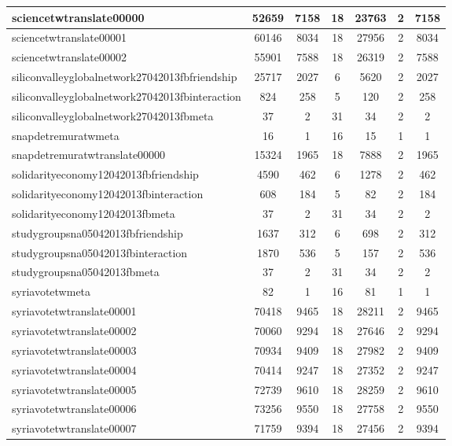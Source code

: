 \begin{table*}[h!]
\begin{center}
\begin{tabular}{| l | c | c | c | c | c | c |}
sciencetwtranslate00000 & 52659  & 7158  & 18  & 23763  & 2  & 7158 \\\hline
sciencetwtranslate00001 & 60146  & 8034  & 18  & 27956  & 2  & 8034 \\\hline
sciencetwtranslate00002 & 55901  & 7588  & 18  & 26319  & 2  & 7588 \\\hline
siliconvalleyglobalnetwork27042013fbfriendship & 25717  & 2027  & 6  & 5620  & 2  & 2027 \\\hline
siliconvalleyglobalnetwork27042013fbinteraction & 824  & 258  & 5  & 120  & 2  & 258 \\\hline
siliconvalleyglobalnetwork27042013fbmeta & 37  & 2  & 31  & 34  & 2  & 2 \\\hline
snapdetremuratwmeta & 16  & 1  & 16  & 15  & 1  & 1 \\\hline
snapdetremuratwtranslate00000 & 15324  & 1965  & 18  & 7888  & 2  & 1965 \\\hline
solidarityeconomy12042013fbfriendship & 4590  & 462  & 6  & 1278  & 2  & 462 \\\hline
solidarityeconomy12042013fbinteraction & 608  & 184  & 5  & 82  & 2  & 184 \\\hline
solidarityeconomy12042013fbmeta & 37  & 2  & 31  & 34  & 2  & 2 \\\hline
studygroupsna05042013fbfriendship & 1637  & 312  & 6  & 698  & 2  & 312 \\\hline
studygroupsna05042013fbinteraction & 1870  & 536  & 5  & 157  & 2  & 536 \\\hline
studygroupsna05042013fbmeta & 37  & 2  & 31  & 34  & 2  & 2 \\\hline
syriavotetwmeta & 82  & 1  & 16  & 81  & 1  & 1 \\\hline
syriavotetwtranslate00001 & 70418  & 9465  & 18  & 28211  & 2  & 9465 \\\hline
syriavotetwtranslate00002 & 70060  & 9294  & 18  & 27646  & 2  & 9294 \\\hline
syriavotetwtranslate00003 & 70934  & 9409  & 18  & 27982  & 2  & 9409 \\\hline
syriavotetwtranslate00004 & 70414  & 9247  & 18  & 27352  & 2  & 9247 \\\hline
syriavotetwtranslate00005 & 72739  & 9610  & 18  & 28259  & 2  & 9610 \\\hline
syriavotetwtranslate00006 & 73256  & 9550  & 18  & 27758  & 2  & 9550 \\\hline
syriavotetwtranslate00007 & 71759  & 9394  & 18  & 27456  & 2  & 9394 \\\hline

\end{tabular}
\end{center}
\end{table*}
